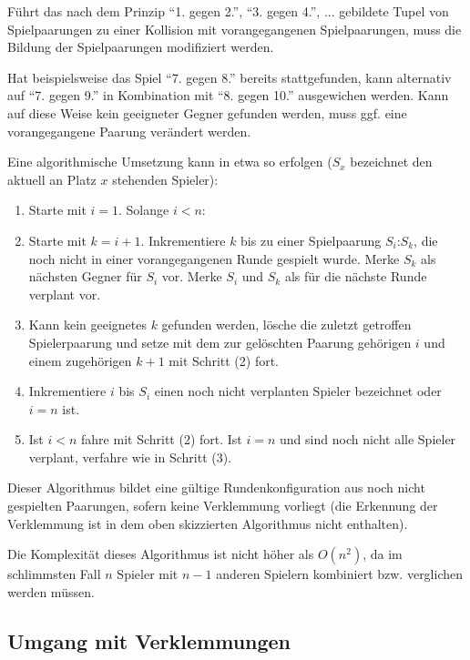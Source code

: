 \documentclass[DIV=15, 10pt]{scrartcl}
\begin{document}
Führt das nach dem Prinzip "`1. gegen 2."', "`3. gegen 4."', ... gebildete Tupel von Spielpaarungen zu einer Kollision mit vorangegangenen Spielpaarungen, muss die Bildung der Spielpaarungen modifiziert werden.

Hat beispielsweise das Spiel "`7. gegen 8."' bereits stattgefunden, kann alternativ auf  "`7. gegen 9."' in Kombination mit "`8. gegen 10."' ausgewichen werden. Kann auf diese Weise kein geeigneter Gegner gefunden werden, muss ggf. eine vorangegangene Paarung verändert werden.

Eine algorithmische Umsetzung kann in etwa so erfolgen ($S_x$ bezeichnet den aktuell an Platz $x$ stehenden Spieler):

\begin{enumerate}

\item Starte mit $i = 1$. Solange $i < n$:

\item Starte mit $k = i + 1$. Inkrementiere $k$ bis zu einer Spielpaarung $S_i$:$S_k$, die noch nicht in einer vorangegangenen Runde gespielt wurde. Merke $S_k$ als nächsten Gegner für $S_i$ vor. Merke $S_i$ und $S_k$ als für die nächste Runde verplant vor.

\item Kann kein geeignetes $k$ gefunden werden, lösche die zuletzt getroffen Spielerpaarung und setze mit dem zur gelöschten Paarung gehörigen $i$ und einem zugehörigen $k+1$ mit Schritt (2) fort.

\item Inkrementiere $i$ bis $S_i$ einen noch nicht verplanten Spieler bezeichnet oder $i = n$ ist.

\item Ist $i < n$ fahre mit Schritt (2) fort. Ist $i = n$ und sind noch nicht alle Spieler verplant, verfahre wie in Schritt (3).

\end{enumerate}

Dieser Algorithmus bildet eine gültige Rundenkonfiguration aus noch nicht gespielten Paarungen, sofern keine Verklemmung vorliegt (die Erkennung der Verklemmung ist in dem oben skizzierten Algorithmus nicht enthalten).

Die Komplexität dieses Algorithmus ist nicht höher als $O(n^2)$, da im schlimmsten Fall $n$ Spieler mit $n-1$ anderen Spielern kombiniert bzw. verglichen werden müssen.

\subsection{Umgang mit Verklemmungen}
\label{laUmgangDeadlock}
\end{document}
